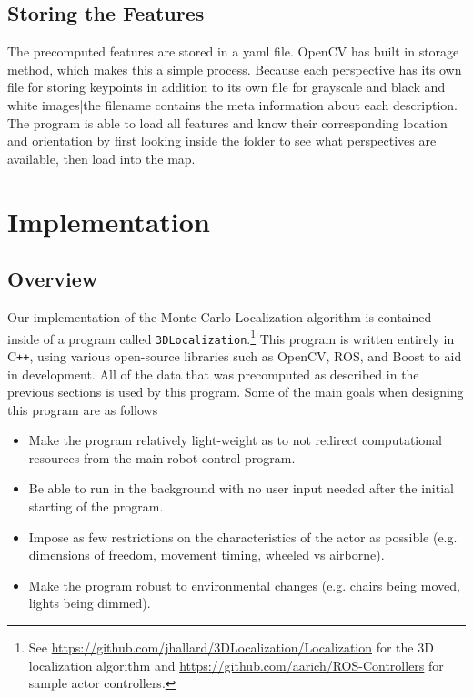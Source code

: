 \documentclass[a4paper,11pt]{article}
\begin{document}
  \subsection{Storing the Features}
The precomputed features are stored in a yaml file. OpenCV has built in storage method, which makes this a simple process. Because each perspective has its own file for storing keypoints in addition to its own file for grayscale and black and white images|the filename contains the meta information about each description. The program is able to load all features and know their corresponding location and orientation by first looking inside the folder to see what perspectives are available, then load into the map.










  \section{Implementation}
\newcommand\cpp{C{}\texttt{++}}
 \subsection{Overview}
 Our implementation of the Monte Carlo Localization algorithm is contained inside of a program called \texttt{3DLocalization}.\footnote{See \url{https://github.com/jhallard/3DLocalization/Localization} for the 3D localization algorithm and \url{https://github.com/aarich/ROS-Controllers} for sample actor controllers.} This program is written entirely in \cpp, using various open-source libraries such as OpenCV, ROS, and Boost to aid in development. All of the data that was precomputed as described in the previous sections is used by this program.
 Some of the main goals when designing this program are as follows 
 \begin{itemize}
 \item Make the program relatively light-weight as to not redirect computational resources from the main robot-control program.
 \item Be able to run in the background with no user input needed after the initial starting of the program. 
 \item Impose as few restrictions on the characteristics of the actor as possible (e.g. dimensions of freedom, movement timing, wheeled vs airborne).
 \item Make the program robust to environmental changes (e.g. chairs being moved, lights being dimmed).
 \end{itemize}
\end{document}
